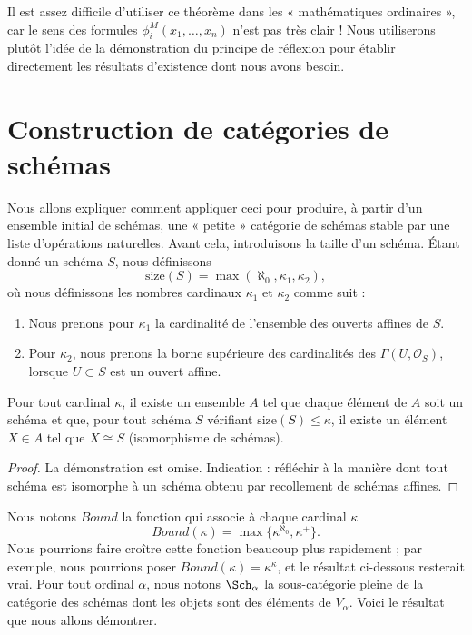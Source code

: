 \medskip\noindent
Il est assez difficile d'utiliser ce théorème dans les « mathématiques
ordinaires », car le sens des formules $\phi_i^M(x_1, \ldots, x_n)$ n'est pas
très clair ! Nous utiliserons plutôt l'idée de la démonstration du principe de
réflexion pour établir directement les résultats d'existence dont nous avons
besoin.

\section{Construction de catégories de schémas}
\label{section-categories-schemes}

\noindent
Nous allons expliquer comment appliquer ceci pour produire, à partir d'un
ensemble initial de schémas, une « petite » catégorie de schémas stable par une
liste d'opérations naturelles. Avant cela, introduisons la taille d'un schéma.
Étant donné un schéma $S$, nous définissons
$$
\text{size}(S) = \max(\aleph_0, \kappa_1, \kappa_2),
$$
où nous définissons les nombres cardinaux $\kappa_1$ et $\kappa_2$ comme suit :
\begin{enumerate}
\item Nous prenons pour $\kappa_1$ la cardinalité de l'ensemble des ouverts
affines de $S$.
\item Pour $\kappa_2$, nous prenons la borne supérieure des cardinalités des
$\Gamma(U, \mathcal{O}_S)$, lorsque $U \subset S$ est un ouvert affine.
\end{enumerate}

\begin{lemma}
\label{lemma-bounded-size}
Pour tout cardinal $\kappa$, il existe un ensemble $A$ tel que chaque élément
de $A$ soit un schéma et que, pour tout schéma $S$ vérifiant
$\text{size}(S) \leq \kappa$, il existe un élément $X \in A$ tel que
$X \cong S$ (isomorphisme de schémas).
\end{lemma}

\begin{proof}
La démonstration est omise. Indication : réfléchir à la manière dont tout schéma est isomorphe à un
schéma obtenu par recollement de schémas affines.
\end{proof}

\noindent
Nous notons $Bound$ la fonction qui associe à chaque cardinal $\kappa$
\begin{equation}
\label{equation-bound}
Bound(\kappa) = \max\{\kappa^{\aleph_0}, \kappa^+\}.
\end{equation}
Nous pourrions faire croître cette fonction beaucoup plus rapidement ; par
exemple, nous pourrions poser $Bound(\kappa) = \kappa^\kappa$, et le résultat
ci-dessous resterait vrai. Pour tout ordinal $\alpha$, nous notons
$\Sch_\alpha$ la sous-catégorie pleine de la catégorie des schémas dont les
objets sont des éléments de $V_\alpha$. Voici le résultat que nous allons
démontrer.

